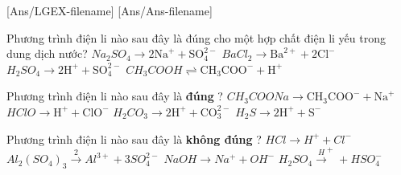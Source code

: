\documentclass[Main.tex]{subfiles}
\begin{document}
[Ans/LGEX-filename]
[Ans/Ans-filename]
\hienthiloigiaiex
\begin{ex}
	Phương trình điện li nào sau đây là đúng cho một hợp chất điện li yếu trong dung dịch nước?
	\choice
	{$Na_2SO_4 \rightarrow 2\text{Na}^+ + \text{SO}_4^{2-}$}
	{$BaCl_2 \rightarrow \text{Ba}^{2+} + 2\text{Cl}^-$}
	{$H_2SO_4 \rightarrow 2\text{H}^+ + \text{SO}_4^{2-}$}
	{\True $CH_3COOH \rightleftharpoons \text{CH}_3\text{COO}^- + \text{H}^+$}
\end{ex}
\begin{ex}
	Phương trình điện li nào sau đây là \textbf{đúng} ?
	\choice
	{\True $CH_3COONa \rightarrow \text{CH}_3\text{COO}^- + \text{Na}^+$}
	{$HClO \rightarrow \text{H}^+ + \text{ClO}^-$}
	{$H_2CO_3 \rightarrow 2\text{H}^+ + \text{CO}_3^{2-}$}
	{$H_2S \rightarrow 2\text{H}^+ + \text{S}^-$}
\end{ex}
\begin{ex}
	Phương trình điện li nào sau đây là \textbf{không đúng} ?
	\choice
	{$HCl \xrightarrow{}  H^+ + Cl^{-}$}
	{$Al_2{(SO_4)}_3 \xrightarrow  2Al^{3+} + 3SO_4^{2-}$}
	{$NaOH \xrightarrow{}  Na^+ + OH^{-}$}
	{\True $H_2SO_4 \xrightarrow  H^+ + HSO_4^{-}$}
\end{ex}
\end{document}
